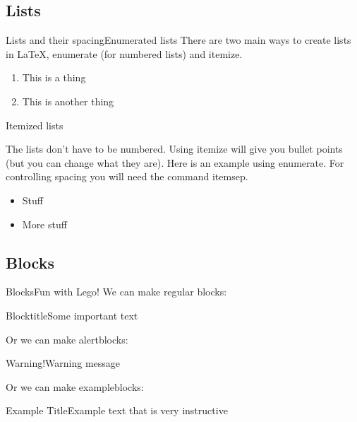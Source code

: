 \documentclass[xcolor={dvipsnames}]{beamer}
\begin{document}
\subsection{Lists}
\begin{frame}{Lists and their spacing}{Enumerated lists}
There are two main ways to create lists in LaTeX, enumerate (for numbered lists) 
and itemize.
\begin{enumerate}
\item This is a thing
\item This is another thing 
\end{enumerate}

\end{frame}

\begin{frame}{Itemized lists}

The lists don't have to be numbered. Using itemize will give you bullet points 
(but you can change what they are). Here is an example using enumerate. For controlling spacing you will need the command itemsep.

\begin{itemize}
\setlength{\itemsep}{1.5em}
\item Stuff
\item More stuff 
\end{itemize}
\end{frame}

\subsection{Blocks}
\begin{frame}{Blocks}{Fun with Lego!}
We can make regular blocks:
\begin{block}
{Blocktitle}{Some important text}
\end{block}

Or we can make alertblocks:
\begin{alertblock}
{Warning!}{Warning message}
\end{alertblock}

Or we can make exampleblocks:
\begin{exampleblock}
{Example Title}{Example text that is very instructive}
\end{exampleblock}
\end{frame}
\end{document}
